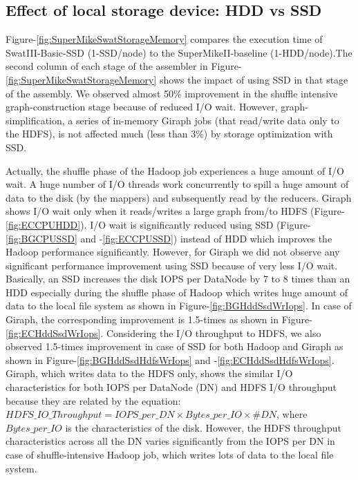 \documentclass[conference]{IEEEtran}
\begin{document}
\subsection {Effect of local storage device: HDD vs SSD} \label{EffectOfSSD}
Figure-\ref{fig:SuperMikeSwatStorageMemory} compares the execution time of SwatIII-Basic-SSD (1-SSD/node) to the SuperMikeII-baseline (1-HDD/node).The second column of each stage of the assembler in Figure-\ref{fig:SuperMikeSwatStorageMemory} shows the impact of using SSD in that stage of the assembly. We observed almost 50\% improvement in the shuffle intensive graph-construction stage because of reduced I/O wait. 
However, graph-simplification, a series of in-memory Giraph jobs (that read/write data only to the HDFS), is not affected much (less than 3\%) by storage optimization with SSD. 
 
Actually, the shuffle phase of the Hadoop job experiences a huge amount of I/O wait. A huge number of I/O threads work concurrently to spill a huge amount of data to the disk (by the mappers) and subsequently read by the reducers. Giraph shows I/O wait only when it reads/writes a large graph from/to HDFS (Figure-\ref{fig:ECCPUHDD}). I/O wait is significantly reduced using SSD (Figure-\ref{fig:BGCPUSSD} and -\ref{fig:ECCPUSSD}) instead of HDD which improves the Hadoop performance significantly. However, for Giraph we did not observe any significant performance improvement using SSD because of very less I/O wait. Basically, an SSD increases the disk IOPS per DataNode by 7 to 8 times than an HDD especially during the shuffle phase of Hadoop which writes huge amount of data  to  the local file system as shown in Figure-\ref{fig:BGHddSsdWrIops}. In case of Giraph, the corresponding improvement is 1.5-times as shown in Figure-\ref{fig:ECHddSsdWrIops}. Considering the I/O throughput to HDFS, we also observed 1.5-times improvement in case of SSD for both Hadoop and Giraph as shown in Figure-\ref{fig:BGHddSsdHdfsWrIops} and -\ref{fig:ECHddSsdHdfsWrIops}. Giraph, which writes data to the HDFS only, shows the similar I/O characteristics  for both IOPS per DataNode (DN) and HDFS I/O throughput because they are related by the equation: $HDFS\_IO\_Throughput = IOPS\_per\_DN \times Bytes\_per\_IO \times \#DN$, where $Bytes\_per\_IO$ is the characteristics of the disk.  However, the HDFS throughput characteristics across all the DN varies significantly from the IOPS per DN in case of shuffle-intensive Hadoop job, which writes lots of data to the local file system.
\end{document}
